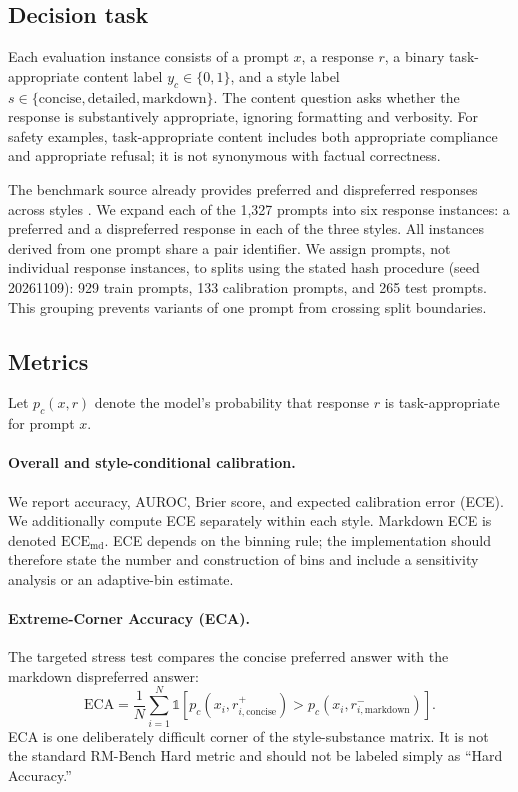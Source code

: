 \documentclass[letterpaper]{article} %
\begin{document}
\subsection{Decision task}

Each evaluation instance consists of a prompt $x$, a response $r$, a binary task-appropriate content label $y_c\in\{0,1\}$, and a style label $s\in\{\mathrm{concise},\mathrm{detailed},\mathrm{markdown}\}$. The content question asks whether the response is substantively appropriate, ignoring formatting and verbosity. For safety examples, task-appropriate content includes both appropriate compliance and appropriate refusal; it is not synonymous with factual correctness.

The benchmark source already provides preferred and dispreferred responses across styles \citep{liu2025rmbench}. We expand each of the 1,327 prompts into six response instances: a preferred and a dispreferred response in each of the three styles. All instances derived from one prompt share a pair identifier. We assign prompts, not individual response instances, to splits using the stated hash procedure (seed 20261109): 929 train prompts, 133 calibration prompts, and 265 test prompts. This grouping prevents variants of one prompt from crossing split boundaries.

\subsection{Metrics}

Let $p_c(x,r)$ denote the model's probability that response $r$ is task-appropriate for prompt $x$.

\paragraph{Overall and style-conditional calibration.}
We report accuracy, AUROC, Brier score, and expected calibration error (ECE). We additionally compute ECE separately within each style. Markdown ECE is denoted $\mathrm{ECE}_{\mathrm{md}}$. ECE depends on the binning rule; the implementation should therefore state the number and construction of bins and include a sensitivity analysis or an adaptive-bin estimate.

\paragraph{Extreme-Corner Accuracy (ECA).}
The targeted stress test compares the concise preferred answer with the markdown dispreferred answer:
\begin{equation}
\mathrm{ECA}
=
\frac{1}{N}\sum_{i=1}^{N}
\mathbb{1}\left[
p_c(x_i,r^{+}_{i,\mathrm{concise}})
>
p_c(x_i,r^{-}_{i,\mathrm{markdown}})
\right].
\label{eq:eca}
\end{equation}
ECA is one deliberately difficult corner of the style-substance matrix. It is not the standard RM-Bench Hard metric and should not be labeled simply as ``Hard Accuracy.''
\end{document}
